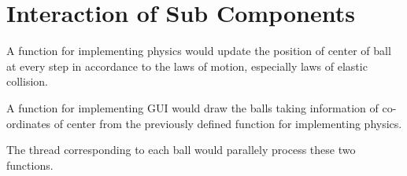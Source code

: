 \documentclass[10pt]{article}
\begin{document}
\section{Interaction of Sub Components}
	A function for implementing physics would update the position of center of ball at every step in accordance to the laws of motion, especially laws of elastic collision.
	
	A function for implementing GUI would draw the balls taking information of co-ordinates of center from the previously defined function for implementing physics.
	
	The thread corresponding to each ball would parallely process these two functions.
\end{document}
